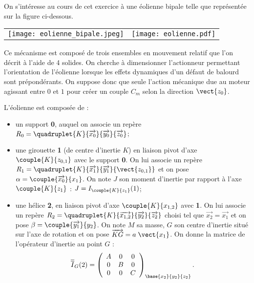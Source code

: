 \ifprof
\else
\begin{multicols}{2}
\fi

\ifprof
\else
On s'intéresse au cours de cet exercice à une éolienne bipale telle que représentée sur la figure ci-dessous. 
\begin{center}
\begin{tabular}{cc}
\texttt{[image: eolienne\_bipale.jpeg]}
&
\texttt{[image: eolienne.pdf]}
\end{tabular}
\end{center}

Ce mécanisme est composé de trois ensembles en mouvement relatif que l'on décrit à l'aide de 4 solides.%
On cherche à dimensionner l'actionneur permettant l'orientation de l'éolienne lorsque les effets dynamiques d'un défaut de balourd sont prépondérants. 
%
On suppose donc que seule l'action mécanique due au moteur agissant entre $0$ et $1$ pour créer un couple $C_m$ selon la direction $\vect{z_0}$. 

L'éolienne est composée de : 
\begin{itemize}
\item un support \textbf{0}, auquel on associe un repère $R_0=\quadruplet{K}{\overrightarrow{x_0}}{\overrightarrow{y_0}}{\overrightarrow{z_0}}$;
\item une girouette \textbf{1} (de centre d'inertie $K$) en liaison pivot d'axe $\couple{K}{{z}_{0,1}}$ avec le support \textbf{0}. On lui associe un repère $R_1=\quadruplet{K}{\overrightarrow{x_1}}{\overrightarrow{y_1}}{\vect{z_{0,1}}}$ et on pose $\alpha=\couple{\overrightarrow{x_0}}{{x}_1}$. On note $J$ son moment d'inertie par rapport à l'axe $\couple{K}{{z}_1}$ : $J=I_{\couple{K}{{z}_1}}(1)$;
\item une hélice \textbf{2}, en liaison pivot d'axe $\couple{K}{{x}_{1,2}}$  avec \textbf{1}. On lui associe un repère $R_2=\quadruplet{K}{\overrightarrow{x_{1,2}}}{\overrightarrow{y_2}}{\overrightarrow{z_2}}$  choisi tel que $\overrightarrow{x_2}=\overrightarrow{x_1}$ et on pose $\beta=\couple{\overrightarrow{y_1}}{{y}_2}$.
On note $M$ sa masse, $G$ son centre d'inertie situé sur l'axe de rotation et on pose $\overrightarrow{KG}=a\;\vect{x_{1}}$. On donne la matrice de l'opérateur d'inertie au point $G$ :
\begin{align*}
\overline{\overline{I}}_G(2)=
\left(
\begin{array}{ccc}
A & 0 & 0 \\ 
0 & B & 0 \\ 
0 & 0 & C
\end{array}
\right)_{\base{{x}_2}{{y}_2}{{z}_2}}.
\end{align*}
 


\end{itemize}
\end{multicols}
